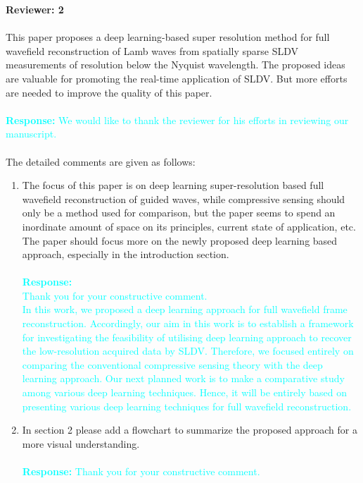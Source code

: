 \documentclass[11pt,a2paper]{report}
\begin{document}
	\noindent\textbf{Reviewer: 2} \\ \\
	This paper proposes a deep learning-based super resolution method for full wavefield reconstruction of Lamb waves from spatially sparse SLDV measurements of resolution below the Nyquist wavelength. 
	The proposed ideas are valuable for promoting the real-time application of SLDV. 
	But more efforts are needed to improve the quality of this paper. \\ \\
	\textcolor{Cyan}
	{
		\textbf{Response:}
		We would like to thank the reviewer for his efforts in reviewing our manuscript.
	} 
	\\ \\
	The detailed comments are given as follows:
	\begin{enumerate}
		\item The focus of this paper is on deep learning super-resolution based full wavefield reconstruction of guided waves, while compressive sensing should only be a method used for comparison, but the paper seems to spend an inordinate amount of space on its principles, current state of application, etc. 
		The paper should focus more on the newly proposed deep learning based approach, especially in the introduction section.
		\\ \\ 
		\textcolor{Cyan}
		{
			\textbf{Response:}\\
			Thank you for your constructive comment. \\
			In this work, we proposed a deep learning approach for full wavefield frame reconstruction.
			Accordingly, our aim in this work is to establish a framework for investigating the feasibility of utilising deep learning approach to recover the low-resolution acquired data by SLDV.			
			Therefore, we focused entirely on comparing the conventional compressive sensing theory with the deep learning approach.
			Our next planned work is to make a comparative study among various deep learning techniques.
			Hence, it will be entirely based on presenting various deep learning techniques for full wavefield reconstruction.
		}
		\item  In section 2 please add a flowchart to summarize the proposed approach for a more visual understanding.
		\\ \\ 
		\textcolor{Cyan}
		{
			\textbf{Response:}
			Thank you for your constructive comment. \\
}
\end{enumerate}
\end{document}
